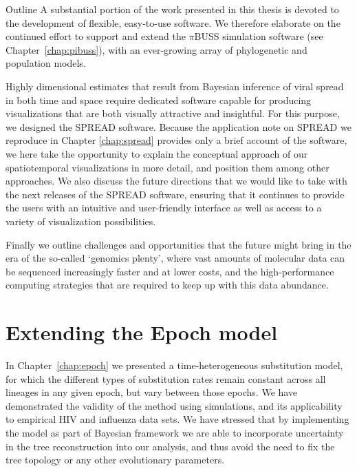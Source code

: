\begin{remark}{Outline}
A substantial portion of the work presented in this thesis is devoted to the development of flexible, easy-to-use software.
We therefore elaborate on the continued effort to support and extend the $\pi$BUSS simulation software (see Chapter~\ref{chap:pibuss}), with an ever-growing array of phylogenetic and population models.

Highly dimensional estimates that result from Bayesian inference of viral spread in both time and space require dedicated software capable for producing visualizations that are both visually attractive and insightful.
For this purpose, we designed the SPREAD software.
Because the application note on SPREAD we reproduce in Chapter \ref{chap:spread} provides only a brief account of the software, we here take the opportunity to explain the conceptual approach of our spatiotemporal visualizations in more detail, and position them among other approaches.
We also discuss the future directions that we would like to take with the next releases of the SPREAD software, ensuring that it continues to provide the users with an intuitive and user-friendly interface as well as access to a variety of visualization possibilities.

Finally we outline challenges and opportunities that the future might bring in the era of the so-called `genomics plenty', where vast amounts of molecular data can be sequenced increasingly faster and at lower costs, and the high-performance computing strategies that are required to keep up with this data abundance.
\end{remark}

\section{Extending the Epoch model}

In Chapter~\ref{chap:epoch} we presented a time-heterogeneous substitution model, for which the different types of substitution rates %
remain constant across all lineages in any given epoch, but vary between those epochs.
We have demonstrated the validity of the method using simulations, and its applicability to empirical HIV and influenza data sets.
We have stressed that by implementing the model as part of Bayesian framework we are able to incorporate uncertainty in the tree reconstruction into our analysis, and thus avoid the need to fix the tree topology or any other evolutionary parameters.

